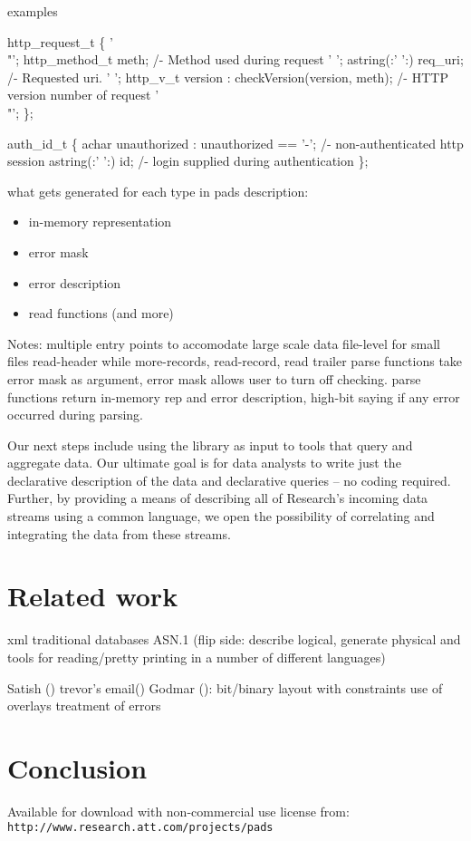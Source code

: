 \documentclass[10pt]{article}
\begin{document}
   examples

\begin{code}
 http_request_t \{
  '\\"'; http_method_t  meth;            /- Method used during request
  ' ';  astring(:' ':) req_uri;         /- Requested uri.
  ' ';  http_v_t       version : checkVersion(version, meth);
                                        /- HTTP version number of request 
  '\\"';
\};

 auth_id_t \{
  achar unauthorized : unauthorized == '-';  /- non-authenticated http session
  astring(:' ':) id;                   /- login supplied during authentication
\};
\end{code}
what gets generated for each type in pads description:
\begin{itemize}
\item in-memory representation
\item error mask
\item error description
\item read functions (and more)
\end{itemize}
Notes:
 multiple entry points to accomodate large scale data
   file-level for small files
   read-header while more-records, read-record, read trailer
parse functions take error mask as argument,
error mask allows user to turn off checking.
parse functions return in-memory rep and error description,
high-bit saying if any error occurred during parsing.

Our next steps include using the library as
input to tools that query and aggregate data.  Our ultimate goal is
for data analysts to write just the declarative description of the
data and declarative queries -- no coding required.  Further, by
providing a means of describing all of Research's incoming data
streams using a common language, we open the possibility of
correlating and integrating the data from these streams.


\section{Related work}
 xml
 traditional databases
 ASN.1 (flip side: describe logical, generate physical and tools for 
        reading/pretty printing in a number of different languages)
 \cite{asn}
 \cite{asdl}

 Satish (\cite{sigcomm00})
 trevor's email(\cite{erlang-bit-syntax})
 Godmar (\cite{gpce02}):
  bit/binary layout with constraints
  use of overlays
  treatment of errors

\section{Conclusion}
Available for download with non-commercial use license from:
\texttt{http://www.research.att.com/projects/pads}
 

\end{document}
